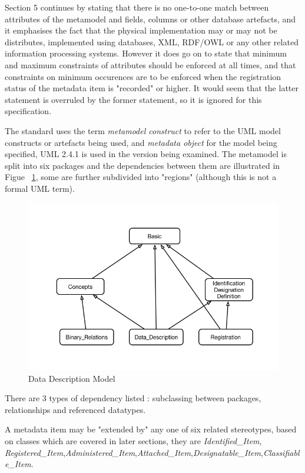\documentclass{llncs}
\begin{document}
Section 5 continues by stating that there is no one-to-one match between attributes of the metamodel and fields, columns or other database artefacts, and it emphasises the fact that the physical implementation may or may not be distributes, implemented using databases, XML, RDF/OWL or any other related information processing systems. However it does go on to state that minimum and maximum constraints of attributes should be enforced at all times, and that constraints on minimum occurences are to be enforced when the registration status of the metadata item is "recorded" or higher. It would seem that the latter statement is overruled by the former statement, so it is ignored for this specification.

The standard uses the term \emph{metamodel construct} to refer to the UML model constructs or artefacts being used, and \emph{metadata object} for the model being specified, UML 2.4.1 is used in the version being examined. The metamodel is split into six packages and the dependencies between them are illustrated in Figue ~\ref{fig:pack}, some are further subdivided into "regions" (although this is not a formal UML term).

\begin{figure}[h]
\includegraphics[width=1.0\textwidth,natwidth=610,natheight=642]{ISOPack}
\caption{Data Description Model} 
\label{fig:pack}
\end{figure}

There are 3 types of dependency listed : subclassing between packages, relationships and referenced datatypes.

A metadata item may be "extended by" any one of six related stereotypes, based on classes which are covered in later sections, they are \emph{Identified\_Item}, \emph{Registered\_Item},\emph{Administered\_Item},\emph{Attached\_Item},\emph{Designatable\_Item},\emph{Classifiable\_Item}.
\begin{zed}
\end{zed}
\end{document}
